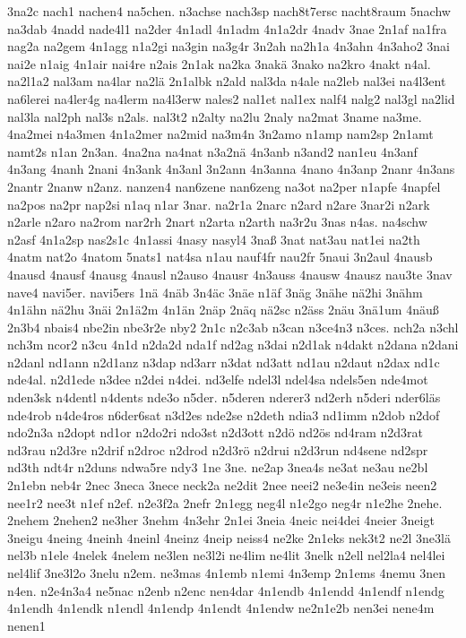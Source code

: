 {3na2c
nach1
nachen4
na5chen.
n3achse
nach3sp
nach8t7ersc
nacht8raum
5nachw
na3dab
4nadd
nade4l1
na2der
4n1adl
4n1adm
4n1a2dr
4nadv
3nae
2n1af
na1fra
nag2a
na2gem
4n1agg
n1a2gi
na3gin
na3g4r
3n2ah
na2h1a
4n3ahn
4n3aho2
3nai
nai2e
n1aig
4n1air
nai4re
n2ais
2n1ak
na2ka
3nakä
3nako
na2kro
4nakt
n4al.
na2l1a2
nal3am
na4lar
na2lä
2n1albk
n2ald
nal3da
n4ale
na2leb
nal3ei
na4l3ent
na6lerei
na4ler4g
na4lerm
na4l3erw
nales2
nal1et
nal1ex
nalf4
nalg2
nal3gl
na2lid
nal3la
nal2ph
nal3s
n2als.
nal3t2
n2alty
na2lu
2naly
na2mat
3name
na3me.
4na2mei
n4a3men
4n1a2mer
na2mid
na3m4n
3n2amo
n1amp
nam2sp
2n1amt
namt2s
n1an
2n3an.
4na2na
na4nat
n3a2nä
4n3anb
n3and2
nan1eu
4n3anf
4n3ang
4nanh
2nani
4n3ank
4n3anl
3n2ann
4n3anna
4nano
4n3anp
2nanr
4n3ans
2nantr
2nanw
n2anz.
nanzen4
nan6zene
nan6zeng
na3ot
na2per
n1apfe
4napfel
na2pos
na2pr
nap2si
n1aq
n1ar
3nar.
na2r1a
2narc
n2ard
n2are
3nar2i
n2ark
n2arle
n2aro
na2rom
nar2rh
2nart
n2arta
n2arth
na3r2u
3nas
n4as.
na4schw
n2asf
4n1a2sp
nas2s1c
4n1assi
4nasy
nasyl4
3naß
3nat
nat3au
nat1ei
na2th
4natm
nat2o
4natom
5nats1
nat4sa
n1au
nauf4fr
nau2fr
5naui
3n2aul
4nausb
4nausd
4nausf
4nausg
4nausl
n2auso
4nausr
4n3auss
4nausw
4nausz
nau3te
3nav
nave4
navi5er.
navi5ers
1nä
4näb
3n4äc
3näe
n1äf
3näg
3nähe
nä2hi
3nähm
4n1ähn
nä2hu
3näi
2n1ä2m
4n1än
2näp
2näq
nä2sc
n2äss
2näu
3nä1um
4näuß
2n3b4
nbais4
nbe2in
nbe3r2e
nby2
2n1c
n2c3ab
n3can
n3ce4n3
n3ces.
nch2a
n3chl
nch3m
ncor2
n3cu
4n1d
n2da2d
nda1f
nd2ag
n3dai
n2d1ak
n4dakt
n2dana
n2dani
n2danl
nd1ann
n2d1anz
n3dap
nd3arr
n3dat
nd3att
nd1au
n2daut
n2dax
nd1c
nde4al.
n2d1ede
n3dee
n2dei
n4dei.
nd3elfe
ndel3l
ndel4sa
ndels5en
nde4mot
nden3sk
n4dentl
n4dents
nde3o
n5der.
n5deren
nderer3
nd2erh
n5deri
nder6läs
nde4rob
n4de4ros
n6der6sat
n3d2es
nde2se
n2deth
ndia3
nd1imm
n2dob
n2dof
ndo2n3a
n2dopt
nd1or
n2do2ri
ndo3st
n2d3ott
n2dö
nd2ös
nd4ram
n2d3rat
nd3rau
n2d3re
n2drif
n2droc
n2drod
n2d3rö
n2drui
n2d3run
nd4sene
nd2spr
nd3th
ndt4r
n2duns
ndwa5re
ndy3
1ne
3ne.
ne2ap
3nea4s
ne3at
ne3au
ne2bl
2n1ebn
neb4r
2nec
3neca
3nece
neck2a
ne2dit
2nee
neei2
ne3e4in
ne3eis
neen2
nee1r2
nee3t
n1ef
n2ef.
n2e3f2a
2nefr
2n1egg
neg4l
n1e2go
neg4r
n1e2he
2nehe.
2nehem
2nehen2
ne3her
3nehm
4n3ehr
2n1ei
3neia
4neic
nei4dei
4neier
3neigt
3neigu
4neing
4neinh
4neinl
4neinz
4neip
neiss4
ne2ke
2n1eks
nek3t2
ne2l
3ne3lä
nel3b
n1ele
4nelek
4nelem
ne3len
ne3l2i
ne4lim
ne4lit
3nelk
n2ell
nel2la4
nel4lei
nel4lif
3ne3l2o
3nelu
n2em.
ne3mas
4n1emb
n1emi
4n3emp
2n1ems
4nemu
3nen
n4en.
n2e4n3a4
ne5nac
n2enb
n2enc
nen4dar
4n1endb
4n1endd
4n1endf
n1endg
4n1endh
4n1endk
n1endl
4n1endp
4n1endt
4n1endw
ne2n1e2b
nen3ei
nene4m
nenen1
}
